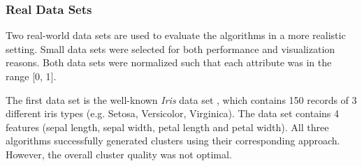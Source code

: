 
\subsubsection{Real Data Sets}
Two real-world data sets are used to evaluate the algorithms in a more realistic setting. Small data sets were selected for both performance and visualization reasons. Both data sets were normalized such that each attribute was in the range [0, 1].

The first data set is the well-known \textit{Iris} data set \cite{iris}, which contains 150 records of 3 different iris types (e.g. Setosa, Versicolor, Virginica). The data set contains 4 features (sepal length, sepal width, petal length and petal width). All three algorithms successfully generated clusters using their corresponding approach. However, the overall cluster quality was not optimal.

